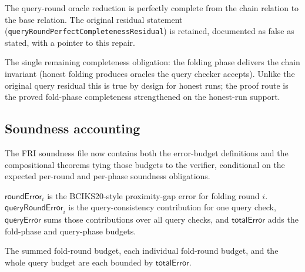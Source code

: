 \begin{theorem}\label{thm:fri_query_completeness}
    The query-round oracle reduction is perfectly complete from the chain relation to the base
    relation.  The original residual statement
    (\texttt{queryRoundPerfectCompletenessResidual}) is retained, documented as false as
    stated, with a pointer to this repair.
\end{theorem}

\begin{definition}\label{def:fri_chain_delivery_residual}
    The single remaining completeness obligation: the folding phase delivers the chain
    invariant (honest folding produces oracles the query checker accepts).  Unlike the
    original query residual this is true by design for honest runs; the proof route is the
    proved fold-phase completeness strengthened on the honest-run support.
\end{definition}

\subsection{Soundness accounting}\label{sec:fri_soundness}

The FRI soundness file now contains both the error-budget definitions and the compositional
theorems tying those budgets to the verifier, conditional on the expected per-round and
per-phase soundness obligations.

\begin{definition}\label{def:fri_error}
    $\mathsf{roundError}_i$ is the BCIKS20-style proximity-gap error for folding round $i$.
    $\mathsf{queryRoundError}_i$ is the query-consistency contribution for one query check,
    $\mathsf{queryError}$ sums those contributions over all query checks, and
    $\mathsf{totalError}$ adds the fold-phase and query-phase budgets.
\end{definition}

\begin{lemma}\label{lem:fri_error_projections}
    The summed fold-round budget, each individual fold-round budget, and the whole query budget
    are each bounded by $\mathsf{totalError}$.
\end{lemma}

